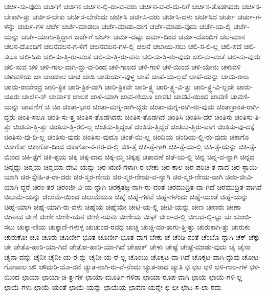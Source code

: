 {ಚರ್ಚಿ-ಸು-ವುದು
ಚರ್ಚಿಗೆ
ಚರ್ಚಿನ
ಚರ್ಚಿನ-ಲ್ಲಿ-ರು-ವ-ವರು
ಚರ್ಚಿನ-ವ-ರೆ-ದು-ರಿಗೆ
ಚರ್ಚಿಸ-ತೊಡಗಿದರು
ಚರ್ಚಿಸ-ಬೇಕಾಗಿ-ತ್ತು
ಚರ್ಚಿಸ-ಬೇಕು
ಚರ್ಚಿಸ-ಬೇಕೆಂದು
ಚರ್ಚಿಸಿ
ಚರ್ಚಿಸಿ-ದರು
ಚರ್ಚಿಸಿ-ದಳು
ಚರ್ಚಿಸಿದ
ಚರ್ಚು
ಚರ್ಚು-ಗ-ಳನ್ನು
ಚರ್ಚು-ಗಳ
ಚರ್ಚೆ
ಚರ್ಚೆ-ಮಾಡಲು
ಚರ್ಚೆ-ಮಾಡು-ವಾಗ
ಚರ್ಚೆ-ಮಾಡು-ವುದು
ಚರ್ಚೆ-ಯ-ಲ್ಲಿ
ಚರ್ಚೆ-ಯನ್ನು
ಚರ್ಚೆ-ಯಾಗು-ತ್ತಿದ್ದಾಗ
ಚರ್ಚೆಗೆ
ಚರ್ಚ್
ಚರ್ಮ-ದಷ್ಟು
ಚರ್ಮ-ದಿಂದ
ಚರ್ಮ-ದೊಂದಿಗೆ
ಚಲ-ಮಾನ
ಚಲನ-ದೊಂದಿಗೆ
ಚಲನವಲನ-ಗ-ಳಿಗೆ
ಚಲನವಲನ-ಗಳ-ಲ್ಲಿ
ಚಲನೆ
ಚಲಾಯಿ-ಸಲು
ಚಲಿ-ಸ-ಲಿ-ಲ್ಲ
ಚಲಿ-ಸದೆ
ಚಲಿ-ಸಲೂ
ಚಲಿ-ಸಿತು
ಚಲಿ-ಸು-ತ್ತಿ-ರು-ವಂತೆ
ಚಲಿ-ಸು-ತ್ತಿ-ರು-ವನು
ಚಲಿ-ಸು-ತ್ತಿ-ರು-ವುದು
ಚಲಿ-ಸು-ವಂತೆ
ಚಲಿ-ಸು-ವುದು
ಚಲಿ-ಸುವ
ಚಳಿ
ಚಳಿ-ಗಾಲ-ವಾಗಿ-ದ್ದು-ದ-ರಿಂದ
ಚಳಿ-ಗಾಲದ
ಚಳಿ-ಗಾಳಿ
ಚಳಿ-ಯಿಂದ
ಚಳಿ-ಯೇನು
ಚಳುವಳಿ
ಚಳುವಳಿಯ
ಚಾ
ಚಾಂಡಾಲ
ಚಾಚಿ
ಚಾಡಿ
ಚಾತುರ್ಯ-ವುಳ್ಳ
ಚಾಪೆ
ಚಾಪೆ-ಯ-ಲ್ಲದೆ
ಚಾಪೆ-ಯನ್ನು
ಚಾಮ-ರಾಜ
ಚಾಮ-ರಾಜೇಂದ್ರ
ಚಾರಿ-ತ್ರಿಕ
ಚಾರಿ-ತ್ರಿಕ-ವಾಗಿ
ಚಾರಿ-ತ್ರಿಕವೇ
ಚಾರಿ-ತ್ರ್ಯ
ಚಾರಿ-ತ್ರ್ಯ-ವಿ-ತ್ತು
ಚಾರಿ-ತ್ರ್ಯ-ವಿ-ಲ್ಲದೇ
ಚಾರು-ಚೂರು
ಚಾರ್ಲೆ-ಸ್
ಚಾರ್ವಾಕ
ಚಾಲಕ
ಚಾಳಿ-ಯಾಗಿ
ಚಾವ-ಣಿಯೂ
ಚಾವಟಿ
ಚಾವಟಿ-ಯಿಂದ
ಚಾವಣಿ
ಚಾವಣಿ-ಯನ್ನು
ಚಾವಣಿಗೆ
ಚಿ
ಚಿಂ
ಚಿಂತಾ-ಭಾರ
ಚಿಂತಾ-ಮಗ್ನ-ರಾಗಿ-ದ್ದರು
ಚಿಂತಾ-ಮಗ್ನ-ರಾಗಿ-ರು-ವುದು
ಚಿಂತಾಕ್ರಾಂತ-ರಾಗಿ-ದ್ದರು
ಚಿಂತಿ-ಸಲೂ
ಚಿಂತಿ-ಸು-ತ್ತ
ಚಿಂತಿಸ-ತೊಡಗಿದರು
ಚಿಂತಿಸ-ತೊಡಗಿದೆ
ಚಿಂತಿಸಿ
ಚಿಂತಿಸಿ-ದರೆ
ಚಿಂತಿಸು
ಚಿಂತಿಸು-ತಿ-ತ್ತು
ಚಿಂತಿಸು-ತ್ತಿ-ತ್ತು
ಚಿಂತಿಸು-ತ್ತಿ-ರಲಿ-ಲ್ಲ
ಚಿಂತಿಸು-ತ್ತಿದ್ದಂತೆ
ಚಿಂತಿಸು-ತ್ತಿದ್ದರೆ
ಚಿಂತಿಸು-ತ್ತಿರು-ವಾಗ
ಚಿಂತಿಸು-ವು-ದಕ್ಕೆ
ಚಿಂತಿಸು-ವು-ದಿ-ಲ್ಲ
ಚಿಂತಿಸು-ವುದು
ಚಿಂತಿಸು-ವುದೂ
ಚಿಂತೆ-ಯಿ-ಲ್ಲ
ಚಿಂದಿಯ
ಚಿಂದಿಯ-ಲ್ಲಿ-ರು-ವುದು
ಚಿಕಾಗೊ
ಚಿಕಾಗೋ
ಚಿಕಾಗೋ-ದಿಂದ
ಚಿಕಾಗೋ-ನ-ಗರ-ದ-ಲ್ಲಿ
ಚಿಕಿ-ತ್ಸೆ
ಚಿಕಿ-ತ್ಸೆ-ಗಾಗಿ
ಚಿಕಿ-ತ್ಸೆ-ಯ-ಲ್ಲಿ
ಚಿಕಿ-ತ್ಸೆ-ಯನ್ನು
ಚಿಕಿ-ತ್ಸೆ-ಯಿಂದ
ಚಿಕಿ-ತ್ಸೆಗೆ
ಚಿಕಿ-ತ್ಸೆಯ
ಚಿಕ್ಕ
ಚಿಕ್ಕ-ದಾದ
ಚಿಕ್ಕ-ಮ್ಮ
ಚಿಕ್ಕಪ್ಪ
ಚಿತಾವಣೆ
ಚಿತೆ-ಯ-ಲ್ಲಿ
ಚಿನ್ನ
ಚಿನ್ನ-ವ-ನ್ನಾಗಿ
ಚಿನ್ನದ
ಚಿನ್ನದ್ದು
ಚಿನ್ಮಯ
ಚಿನ್ಮಯಾ-ದೇವಿ-ಯನ್ನು
ಚಿರ-ಋಣಿ-ಗಳಾಗಿ-ರ-ಬೇಕು
ಚಿರ-ಕಾಲ
ಚಿರ-ಪರಿಚಿ-ತ-ನಾದ
ಚಿರ-ಸ್ಥಾಯಿ-ಯಾಗಿ
ಚಿರ-ಸ್ನೇಹಿ-ತ-ರಾ-ದರು
ಚಿರ-ಸ್ಮರ-ಣೀಯ
ಚಿರ-ಸ್ಮರ-ಣೀಯ-ವ-ನ್ನಾಗಿ
ಚಿರ-ಸ್ಮರ-ಣೀಯ-ವಾಗಿ
ಚಿರಂ-ಜೀವಿ-ಯಾಗಿ-ದ್ದರೆ
ಚಿರಂ-ತರ
ಚಿರಂಜೀ-ವಿ-ಯ-ನ್ನಾಗಿ
ಚಿರಕೃತಜ್ಞ-ನಾಗಿ-ರು-ವಂತೆ
ಚಿರಮುದ್ರಿತ-ವಾ-ಗಿದೆ
ಚಿರಮುದ್ರಿತ-ವಾಗಿವೆ
ಚಿಲುಮೆ-ಯನ್ನು
ಚಿಲುಮೆ-ಯಿಂದ
ಚಿಲುಮೆಯೂ
ಚಿಹ್ನೆ
ಚಿಹ್ನೆ-ಗಳಿವೆ
ಚಿಹ್ನೆ-ಗಳೆಂದು
ಚಿಹ್ನೆ-ಯಂತೆ
ಚಿಹ್ನೆ-ಯನ್ನು
ಚಿಹ್ನೆ-ಯಾಗಿ
ಚಿಹ್ನೆ-ಯಾಗಿ-ರು-ವಳು
ಚಿಹ್ನೆಯ
ಚಿಹ್ನೆಯೇ
ಚೀಟಿ-ಯ-ಲ್ಲಿ
ಚೀಟಿ-ಯನ್ನು
ಚೀಣ
ಚೀಣರು
ಚೀಣಾ
ಚೀಣಾದ
ಚೀಣಿ
ಚೀಣೀ
ಚೀಣೀ-ಯನ
ಚೀಣೀ-ಯನು
ಚೀಣೀಯ
ಚೀಫ್
ಚೀಲ-ದ-ಲ್ಲಿ
ಚೀಲದ-ಲ್ಲಿ-ಟ್ಟು
ಚು
ಚುಂಬಿ-ಸಲು
ಚುಕ್ಕಾ-ಣಿಯ
ಚುಕ್ಕಾಣಿ-ಗಳುಳ್ಳ
ಚುಚುಂದ-ರವಧ
ಚುಚ್ಚಿ
ಚುಚ್ಚಿ-ದಂ-ತಾಗು-ತ್ತಿ-ತ್ತು
ಚುರುಕಾಗಿ-ತ್ತು
ಚುರುಕು
ಚುರುಕೋ
ಚೂ
ಚೂರು
ಚೂರ್ಣೀ-ಭೂತ
ಚೂರ್ಣೀ-ಭೂತ-ವಾಗ-ಬೇಕು
ಚೆ
ಚೆಂಡಿ-ನಂತೆ
ಚೆಂಬೊ-ನ್ನಾಗಿ
ಚೆಕ್
ಚೆಕ್ಕು
ಚೇ
ಚೇತೊ-ಹಾರಿ-ಯಾ-ಗಿದೆ
ಚೇತೋ-ಹಾರಿ-ಯಾ-ಗಿದೆ
ಚೇಪಾಕ್
ಚೇಳು
ಚೇಷ್ಟೆ
ಚೇಷ್ಟೆ-ಮಾಡು-ವುದು
ಚೈ
ಚೈನಾ
ಚೈನಾ-ವನ್ನು
ಚೈನೀ
ಚೈನೀ-ಯ-ರ-ನ್ನು
ಚೈನೀ-ಯ-ರೆ-ಲ್ಲ
ಚೊಂಬು
ಚೊಕ್ಕಟ-ವಾ-ಗಿದೆ
ಚೊಕ್ಕಟ-ವಾಗಿ-ದ್ದುವು
ಚೋಟ-ಗೋಪಾಲ
ಚೌ
ಚೌದುರಿ-ಯೊ-ಡನೆ
ಚ್ಯುತ-ನಾಗಿ-ರು-ವೆ-ನೆಂದು
ಚ್ಯುತ-ರಾದ
ಚ್ಯುತಿ
ಛ
ಛಲ
ಛಳಿ
ಛಳಿ-ಗಾಲ-ಗಳ
ಛಳಿ-ಯಿಂದ
ಛಾಯಾ
ಛಾಯಾ-ಚಿ-ತ್ರ-ಗಳ
ಛಾಯಾ-ಮೂರ್ತಿ-ಗಳಿರಾ
ಛಾಯಾ-ರೂಪ-ವಾಗಿ
ಛಾಯೆ
ಛಾಯೆ-ಗಳಿ-ಲ್ಲ
ಛಾಯೆ-ಗಳು
ಛಾಯೆ-ಯಂತೆ
ಛಾಯೆ-ಯನ್ನು
ಛಾಯೆಯ
ಛಾವಣಿ-ಯನ್ನೇ
ಛಿ
ಛೀ
ಛೇದಿ-ಸ-ಲಾ-ರದು
}

